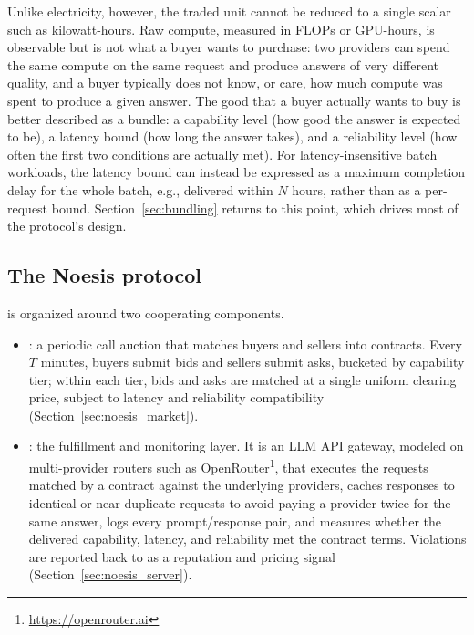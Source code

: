 Unlike electricity, however, the traded unit cannot be reduced to a single
scalar such as kilowatt-hours. Raw compute, measured in FLOPs or GPU-hours,
is observable but is not what a buyer wants to purchase: two providers can
spend the same compute on the same request and produce answers of very
different quality, and a buyer typically does not know, or care, how much
compute was spent to produce a given answer. The good that a buyer actually
wants to buy is better described as a bundle: a capability level (how good
the answer is expected to be), a latency bound (how long the answer takes),
and a reliability level (how often the first two conditions are actually
met). For latency-insensitive batch workloads, the latency bound can
instead be expressed as a maximum completion delay for the whole batch,
e.g., delivered within $N$ hours, rather than as a per-request bound.
Section~\ref{sec:bundling} returns to this point, which drives most of the
protocol's design.

\subsection{The Noesis protocol}
\label{sec:protocol_overview}

\Noesis{} is organized around two cooperating components.

\begin{itemize}
  \item \textbf{\NoesisMarket}: a periodic call auction that matches buyers
    and sellers into contracts. Every $T$ minutes, buyers submit bids and
    sellers submit asks, bucketed by capability tier; within each tier, bids
    and asks are matched at a single uniform clearing price, subject to
    latency and reliability compatibility (Section~\ref{sec:noesis_market}).

  \item \textbf{\NoesisServer}: the fulfillment and monitoring layer. It is
    an LLM API gateway, modeled on multi-provider routers such as
    OpenRouter\footnote{\url{https://openrouter.ai}}, that executes the
    requests matched by a \NoesisMarket{} contract against the underlying
    providers, caches responses to identical or near-duplicate requests to
    avoid paying a provider twice for the same answer, logs every
    prompt/response pair, and measures whether the delivered capability,
    latency, and reliability met the contract terms. Violations are
    reported back to \NoesisMarket{} as a reputation and pricing signal
    (Section~\ref{sec:noesis_server}).
\end{itemize}

